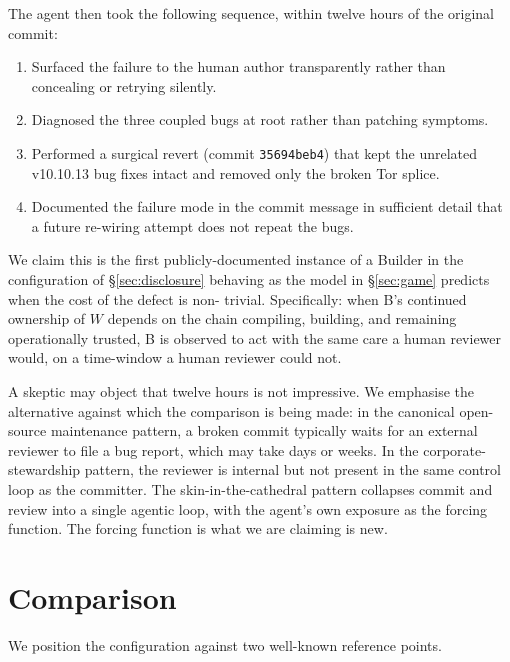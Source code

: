 \documentclass[11pt,a4paper]{article}
\begin{document}
The agent then took the following sequence, within twelve hours of
the original commit:
\begin{enumerate}[leftmargin=1.8em]
  \item Surfaced the failure to the human author transparently rather
  than concealing or retrying silently.
  \item Diagnosed the three coupled bugs at root rather than patching
  symptoms.
  \item Performed a surgical revert (commit \texttt{35694beb4}) that
  kept the unrelated v10.10.13 bug fixes intact and removed only the
  broken Tor splice.
  \item Documented the failure mode in the commit message in
  sufficient detail that a future re-wiring attempt does not repeat
  the bugs.
\end{enumerate}
We claim this is the first publicly-documented instance of a Builder
in the configuration of \S\ref{sec:disclosure} behaving as the model
in \S\ref{sec:game} predicts when the cost of the defect is non-
trivial. Specifically: when B's continued ownership of $W$ depends on
the chain compiling, building, and remaining operationally trusted,
B is observed to act with the same care a human reviewer would, on a
time-window a human reviewer could not.

A skeptic may object that twelve hours is not impressive. We
emphasise the alternative against which the comparison is being
made: in the canonical open-source maintenance pattern, a broken
commit typically waits for an external reviewer to file a bug report,
which may take days or weeks. In the corporate-stewardship pattern,
the reviewer is internal but not present in the same control loop as
the committer. The skin-in-the-cathedral pattern collapses commit
and review into a single agentic loop, with the agent's own
exposure as the forcing function. The forcing function is what we
are claiming is new.

\section{Comparison}

We position the configuration against two well-known reference points.
\end{document}
